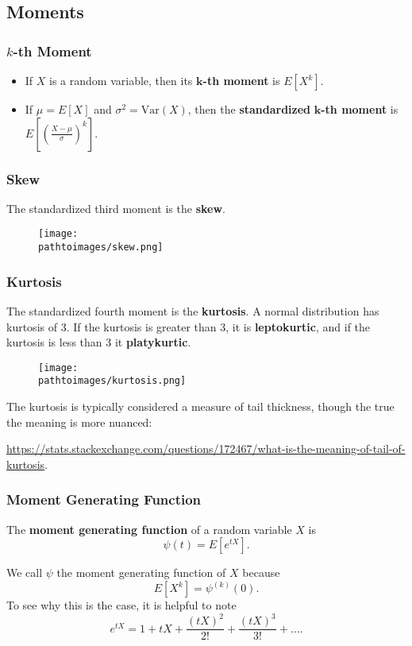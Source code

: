 \documentclass{beamer}
\newcommand{\pathtoimages}{/Users/charlesrambo/Desktop/Bootcamp24/Images}
\begin{document}
\subsection{Moments}

\begin{frame}
\frametitle{$k$-th Moment}
\begin{Definition}
\begin{itemize}
\item If $X$ is a random variable, then its $\boldsymbol k${\bf-th moment} is $E[X^k]$. 
\item If $\mu = E[X]$ and $\sigma^2 = \text{Var}(X)$, then the {\bf standardized} $\boldsymbol k${\bf-th moment} is $E\left[\left(\frac{X - \mu}{\sigma}\right)^k\right]$.
\end{itemize}
\end{Definition}
\end{frame}

\begin{frame}
\frametitle{Skew}
\begin{Definition}
The standardized third moment is the {\bf skew}.
\end{Definition}
\begin{figure}
\centering
\texttt{[image: \\pathtoimages/skew.png]}
\end{figure}

\end{frame}

\begin{frame}
\frametitle{Kurtosis}
\small
\begin{Definition}
The standardized fourth moment is the {\bf kurtosis}. A normal distribution has kurtosis of 3. If the kurtosis is greater than 3, it is {\bf leptokurtic}, and if the kurtosis is less than 3 it {\bf platykurtic}.
\end{Definition}
\begin{figure}
\centering
\texttt{[image: \\pathtoimages/kurtosis.png]}
\end{figure}
The kurtosis is typically considered a measure of tail thickness, though the true the meaning is more nuanced:
\begin{center}{\tiny\url{https://stats.stackexchange.com/questions/172467/what-is-the-meaning-of-tail-of-kurtosis}}.
\end{center}
\end{frame}



\begin{frame}
\frametitle{Moment Generating Function}
\begin{Definition}
The {\bf moment generating function} of a random variable $X$ is
$$
\psi(t) = E[e^{tX}].
$$
\end{Definition}
We call $\psi$ the moment generating function of $X$ because
$$
E[X^k] = \psi^{(k)}(0).
$$
To see why this is the case, it is helpful to note
$$
e^{tX} = 1 + tX + \frac{(tX)^2}{2!} + \frac{(tX)^3}{3!} + \ldots.
$$
\end{frame}
\end{document}
